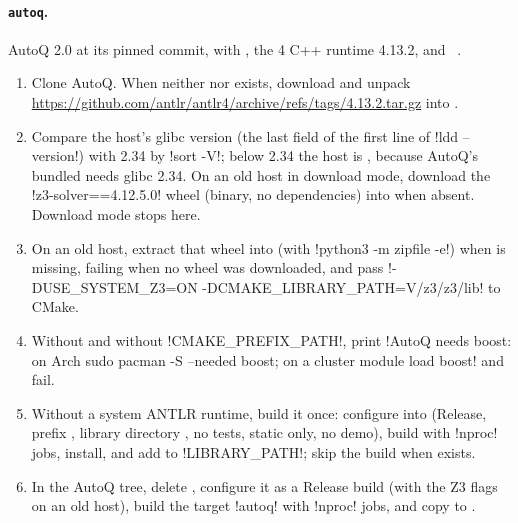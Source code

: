 {\paragraph{\texttt{autoq}.} AutoQ 2.0 at its pinned commit, with , the  4 C++ runtime 4.13.2, and ~\cite{demoura2008z3}.
\begin{enumerate}
\item Clone AutoQ. When neither  nor  exists, download and unpack \url{https://github.com/antlr/antlr4/archive/refs/tags/4.13.2.tar.gz} into .
\item Compare the host's glibc version (the last field of the first line of \code!ldd --version!) with 2.34 by \code!sort -V!; below 2.34 the host is , because AutoQ's bundled  needs glibc 2.34. On an old host in download mode, download the \code!z3-solver==4.12.5.0! wheel (binary, no dependencies) into  when absent. Download mode stops here.
\item On an old host, extract that wheel into  (with \code!python3 -m zipfile -e!) when  is missing, failing when no wheel was downloaded, and pass \code!-DUSE_SYSTEM_Z3=ON -DCMAKE_LIBRARY_PATH=V/z3/z3/lib! to CMake.
\item Without  and without \code!CMAKE_PREFIX_PATH!, print \code!AutoQ needs boost: on Arch sudo pacman -S --needed boost; on a cluster module load boost! and fail.
\item Without a system ANTLR runtime, build it once: configure  into  (Release, prefix , library directory , no tests, static only, no demo), build with \code!nproc! jobs, install, and add  to \code!LIBRARY_PATH!; skip the build when  exists.
\item In the AutoQ tree, delete , configure it as a Release build (with the Z3 flags on an old host), build the target \code!autoq! with \code!nproc! jobs, and copy  to .
\end{enumerate}

}
